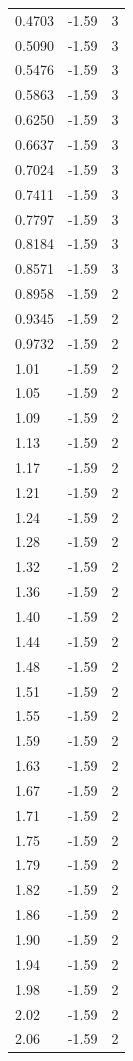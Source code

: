 \begin{longtable}{lrr}
  0.4703 & -1.59 & 3 \\
  0.5090 & -1.59 & 3 \\
  0.5476 & -1.59 & 3 \\
  0.5863 & -1.59 & 3 \\
  0.6250 & -1.59 & 3 \\
  0.6637 & -1.59 & 3 \\
  0.7024 & -1.59 & 3 \\
  0.7411 & -1.59 & 3 \\
  0.7797 & -1.59 & 3 \\
  0.8184 & -1.59 & 3 \\
  0.8571 & -1.59 & 3 \\
  0.8958 & -1.59 & 2 \\
  0.9345 & -1.59 & 2 \\
  0.9732 & -1.59 & 2 \\
  1.01 & -1.59 & 2 \\
  1.05 & -1.59 & 2 \\
  1.09 & -1.59 & 2 \\
  1.13 & -1.59 & 2 \\
  1.17 & -1.59 & 2 \\
  1.21 & -1.59 & 2 \\
  1.24 & -1.59 & 2 \\
  1.28 & -1.59 & 2 \\
  1.32 & -1.59 & 2 \\
  1.36 & -1.59 & 2 \\
  1.40 & -1.59 & 2 \\
  1.44 & -1.59 & 2 \\
  1.48 & -1.59 & 2 \\
  1.51 & -1.59 & 2 \\
  1.55 & -1.59 & 2 \\
  1.59 & -1.59 & 2 \\
  1.63 & -1.59 & 2 \\
  1.67 & -1.59 & 2 \\
  1.71 & -1.59 & 2 \\
  1.75 & -1.59 & 2 \\
  1.79 & -1.59 & 2 \\
  1.82 & -1.59 & 2 \\
  1.86 & -1.59 & 2 \\
  1.90 & -1.59 & 2 \\
  1.94 & -1.59 & 2 \\
  1.98 & -1.59 & 2 \\
  2.02 & -1.59 & 2 \\
  2.06 & -1.59 & 2 \\

\end{longtable}

